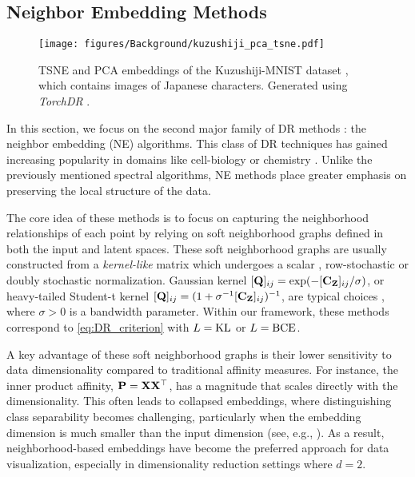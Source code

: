 \subsection{Neighbor Embedding Methods}\label{sec:neighbor_embedding}

\begin{figure}[t]
    \centering
    \texttt{[image: figures/Background/kuzushiji\_pca\_tsne.pdf]}
    \caption{TSNE and PCA embeddings of the Kuzushiji-MNIST dataset \citep{clanuwat2018deep}, which contains images of Japanese characters. Generated using \emph{TorchDR} \citep{vanassel2024torchdr}.
    }
    \label{fig:kuzushiji}
\end{figure}

In this section, we focus on the second major family of DR methods : the neighbor embedding (NE) algorithms. This class of DR techniques has gained increasing popularity in domains like cell-biology \citep{kobak2019art} or chemistry \citep{mai2022machine}. Unlike the previously mentioned spectral algorithms, NE methods place greater emphasis on preserving the local structure of the data.

The core idea of these methods is to focus on capturing the neighborhood relationships of each point by relying on soft neighborhood graphs defined in both the input and latent spaces. These soft neighborhood graphs are usually constructed from a \emph{kernel-like} matrix which undergoes a scalar \citep{van2008visualizing}, row-stochastic \citep{hinton2002stochastic} or doubly stochastic \citep{lu2019doubly,van2023snekhorn} normalization. Gaussian kernel $[{\mathbf{Q}}]_{ij} = \exp(- [{\mathbf{C}}_{{\mathbf{Z}}}]_{ij} / \sigma)$, or heavy-tailed Student-t kernel $[{\mathbf{Q}}]_{ij} = (1+\sigma^{-1}[{\mathbf{C}}_{{\mathbf{Z}}}]_{ij})^{-1}$, are typical choices \citep{van2008visualizing}, where $\sigma > 0$ is a bandwidth parameter.
Within our framework, these methods correspond to \cref{eq:DR_criterion} with $L = \operatorname{KL}$ or $L=\operatorname{BCE}$.

A key advantage of these soft neighborhood graphs is their lower sensitivity to data dimensionality compared to traditional affinity measures. For instance, the inner product affinity, ${\mathbf{P}} = {\mathbf{X}} {\mathbf{X}}^\top$, has a magnitude that scales directly with the dimensionality. This often leads to collapsed embeddings, where distinguishing class separability becomes challenging, particularly when the embedding dimension is much smaller than the input dimension (see, e.g., ). As a result, neighborhood-based embeddings have become the preferred approach for data visualization, especially in dimensionality reduction settings where $d=2$.

